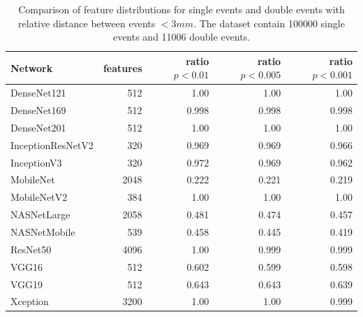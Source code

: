 \documentclass[12pt, notitlepage]{article}
\begin{document}
\begin{table}
    \begin{tabular}{lrrrr}
	\hline
	 Network           &   features &   ratio $p < 0.01$ &   ratio $p < 0.005$ &   ratio $p < 0.001$ \\
	\hline
	 DenseNet121       &            512 &         1.00  &          1.00  &          1.00  \\
	 DenseNet169       &            512 &         0.998 &          0.998 &          0.998 \\
	 DenseNet201       &            512 &         1.00  &          1.00  &          1.00  \\
	 InceptionResNetV2 &            320 &         0.969 &          0.969 &          0.966 \\
	 InceptionV3       &            320 &         0.972 &          0.969 &          0.962 \\
	 MobileNet         &           2048 &         0.222 &          0.221 &          0.219 \\
	 MobileNetV2       &            384 &         1.00  &          1.00  &          1.00  \\
	 NASNetLarge       &           2058 &         0.481 &          0.474 &          0.457 \\
	 NASNetMobile      &            539 &         0.458 &          0.445 &          0.419 \\
	 ResNet50          &           4096 &         1.00  &          0.999 &          0.999 \\
	 VGG16             &            512 &         0.602 &          0.599 &          0.598 \\
	 VGG19             &            512 &         0.643 &          0.643 &          0.639 \\
	 Xception          &           3200 &         1.00  &          1.00  &          0.999 \\
	\hline
    \end{tabular}
    \caption{Comparison of feature distributions for single events and double events with relative distance
	between events $< 3mm$. The dataset contain 100000 single events and 11006 double events.}
    \label{tab:features-close}
\end{table}
\end{document}
